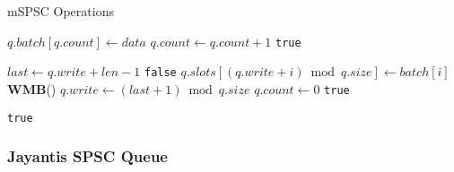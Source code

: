 \begin{algorithm}[!ht]
    \centering
    \captionsetup{justification=centering}
    \caption{\acl{mSPSC} Operations\cite{torquati2010singleproducersingleconsumerqueuessharedcache}}
    \label{alg:mspsc}
    \scriptsize
    \begin{algorithmic}[1]
            \State $q.batch[q.count] \gets data$
            \State $q.count \gets q.count + 1$
                \State \Return {}
            \EndIf
            \State \Return \texttt{true}
        \EndFunction
        
        \State
        
            \State $last \gets q.write + len - 1$ 
                \State \Return \texttt{false} 
            \EndIf
             
                \State $q.slots[(q.write + i) \bmod q.size] \gets batch[i]$
            \EndFor
            \State \textbf{WMB}() 
            \State $q.write \gets (last + 1) \bmod q.size$
            \State $q.count \gets 0$ 
            \State \Return \texttt{true}
        \EndFunction
        
        \State
        
                \State \Return {}
            \EndIf
            \State \Return \texttt{true}
        \EndFunction
    \end{algorithmic}
 \end{algorithm}

\subsubsection{Jayantis \ac{SPSC} Queue}

